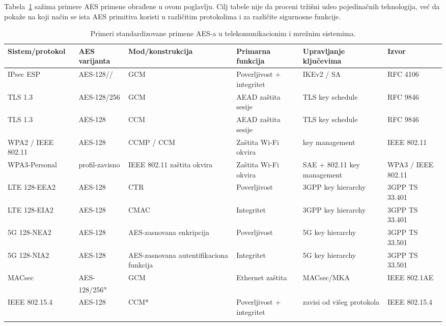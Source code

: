 Tabela~\ref{tab:aes-telekom-map} sažima primere AES primene obrađene u
ovom poglavlju. Cilj tabele nije da proceni tržišni udeo pojedinačnih
tehnologija, već da pokaže na koji način se ista AES primitiva koristi
u različitim protokolima i za različite sigurnosne funkcije.

\begin{table}[htbp]
\centering
\small
\setlength{\tabcolsep}{3pt}
\caption{Primeri standardizovane primene AES-a u telekomunikacionim
i mrežnim sistemima.}
\label{tab:aes-telekom-map}
\begin{tabular}{@{}>{\raggedright\arraybackslash}p{}
>{\raggedright\arraybackslash}p{}
>{\raggedright\arraybackslash}p{}
>{\raggedright\arraybackslash}p{}
>{\raggedright\arraybackslash}p{}
>{\raggedright\arraybackslash}p{}@{}}
\toprule
Sistem/protokol &
AES varijanta &
Mod/konstrukcija &
Primarna funkcija &
Upravljanje ključevima &
Izvor \\
\midrule



IPsec ESP &
AES-128/\allowbreak 192/\allowbreak 256 &
GCM &
Poverljivost + integritet &
IKEv2 / SA &
RFC 4106 \\
\addlinespace[3pt]
TLS 1.3 &
AES-128/256 &
GCM &
AEAD zaštita sesije &
TLS key schedule &
RFC 9846 \\
\addlinespace[3pt]
TLS 1.3 &
AES-128 &
CCM &
AEAD zaštita sesije &
TLS key schedule &
RFC 9846 \\
\addlinespace[3pt]
WPA2 / IEEE 802.11 &
AES-128 &
CCMP / CCM &
Zaštita Wi-Fi okvira &
802.11 key management &
IEEE 802.11 \\
\addlinespace[3pt]
WPA3-Personal &
profil-zavisno &
IEEE 802.11 zaštita okvira &
Zaštita Wi-Fi okvira &
SAE + 802.11 key management &
WPA3 / IEEE 802.11 \\
\addlinespace[3pt]
LTE 128-EEA2 &
AES-128 &
CTR &
Poverljivost &
3GPP key hierarchy &
3GPP TS 33.401 \\
\addlinespace[3pt]
LTE 128-EIA2 &
AES-128 &
CMAC &
Integritet &
3GPP key hierarchy &
3GPP TS 33.401 \\
\addlinespace[3pt]
5G 128-NEA2 &
AES-128 &
AES-zasnovana enkripcija &
Poverljivost &
5G key hierarchy &
3GPP TS 33.501 \\
\addlinespace[3pt]
5G 128-NIA2 &
AES-128 &
AES-zasnovana autentifikaciona funkcija &
Integritet &
5G key hierarchy &
3GPP TS 33.501 \\
\addlinespace[3pt]
MACsec &
AES-128/256\textsuperscript{a} &
GCM &
Ethernet zaštita &
MACsec/MKA &
IEEE 802.1AE \\
\addlinespace[3pt]
IEEE 802.15.4 &
AES-128 &
CCM* &
Poverljivost + integritet &
zavisi od višeg protokola &
IEEE 802.15.4 \\
\addlinespace[3pt]
\bottomrule
\end{tabular}


\end{table}
